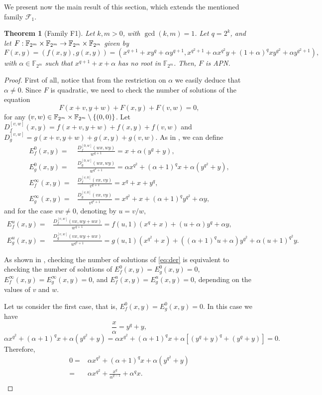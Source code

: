 \documentclass{article}
\newtheorem{theorem}{Theorem}
\newcommand{\cF}{\mathcal{F}}
\begin{document}
{We present now the main result of this section, which extends the mentioned family $\cF_1$.}

\begin{theorem}[Family F1]\label{th:main}
Let $k,m>0$, with $\gcd(k,m)=1$. Let $q=2^k$, and let $F:{\Bbb F}_{2^m}\times{\Bbb F}_{2^m}\rightarrow{\Bbb F}_{2^m}\times{\Bbb F}_{2^m}$ given by
$$F(x,y)=(f(x,y),g(x,y))=(x^{q+1}+xy^q+\alpha y^{q+1}, x^{q^2+1}+\alpha x^{q^2}y+(1+\alpha)^qxy^{q^2}+\alpha y^{q^2+1}),$$
with $\alpha\in\mathbb{F}_{2^m}$ such that $ x^{q+1}+x+\alpha$ has no root in $\mathbb{F}_{2^m}$. Then, $F$ is APN.
\end{theorem}
\begin{proof}
First of all, notice that from the restriction on $\alpha$ we easily deduce that $\alpha\ne0$.
Since $F$ is quadratic, we need to check the number of solutions of the equation
\begin{equation}\label{eq:der}
F(x+v,y+w)+F(x,y)+F(v,w)=0,
\end{equation}
for any $(v,w)\in{\Bbb F}_{2^m}\times{\Bbb F}_{2^m}\setminus\{(0,0)\}$.
Let $D_f^{[v,w]}(x,y)=f(x+v,y+w)+f(x,y)+f(v,w)$ and $D_g^{[v,w]}=g(x+v,y+w)+g(x,y)+g(v,w)$. As in \cite{GOLOGLU}, we can define 
\begin{align*}
  E_f^0(x,y)=&\frac{D_f^{[0,w]}(wx,wy)}{w^{q+1}}=x+\alpha (y^q+y),  \\
  E_g^0(x,y)=&\frac{D_g^{[0,w]}(wx,wy)}{w^{q^2+1}}=\alpha x^{q^2}+(\alpha+1)^qx+\alpha (y^{q^2}+y),\\
  E_f^\infty(x,y)=&\frac{D_f^{[v,0]}(vx,vy)}{v^{q+1}}=x^q+x+y^q,\\
  E_g^\infty(x,y)=&\frac{D_g^{[v,0]}(vx,vy)}{v^{q^2+1}}= x^{q^2}+x+(\alpha+1)^qy^{q^2}+\alpha y,
\end{align*}
and for the case $vw\ne 0$, denoting by $u=v/w$,
\begin{align*}
   E_f^u(x,y)=&\frac{D_f^{[v,w]}(vx,wy+wx)}{w^{q+1}}=f(u,1)(x^q+x)+(u+\alpha) y^q+\alpha y, \\
   E_g^u(x,y)=&\frac{D_g^{[v,w]}(vx,wy+wx)}{w^{q^2+1}}=g(u,1)(x^{q^2}+x)+((\alpha+1)^qu+\alpha) y^{q^2}+\alpha(u+1)^{q^2} y.
\end{align*}


As shown in \cite{GOLOGLU}, checking the number of solutions of \eqref{eq:der} is equivalent to checking the number of solutions of $E_f^0(x,y)=E_g^0(x,y)=0$, $E_f^\infty(x,y)=E_g^\infty(x,y)=0$, and $E_f^u(x,y)=E_g^u(x,y)=0$, depending on the values of $v$ and $w$.

Let us consider the first case, that is, $E_f^0(x,y)=E_g^0(x,y)=0$. In this case we have
$$
\frac{x}{\alpha}= y^q+y,
$$
$$
\alpha x^{q^2}+(\alpha+1)^qx+\alpha (y^{q^2}+y)=\alpha x^{q^2}+(\alpha+1)^qx+\alpha [(y^{q}+y)^q+(y^{q}+y)]=0.
$$
Therefore,
$$
\begin{aligned}
0=&\alpha x^{q^2}+(\alpha+1)^qx+\alpha (y^{q^2}+y)\\
=&\alpha x^{q^2}+\frac{x^q}{\alpha^{q-1}}+\alpha^qx.\\
\end{aligned}
$$


\end{proof}
\end{document}
